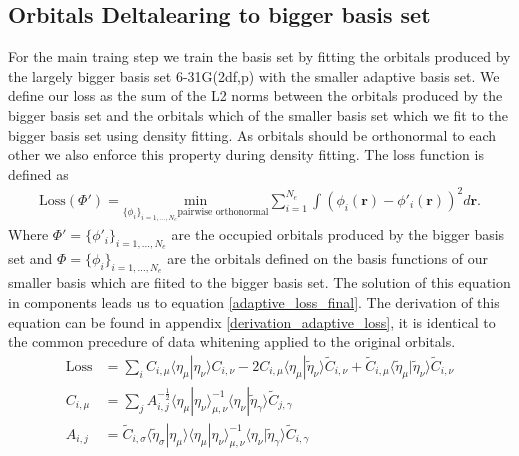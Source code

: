 \subsection{Orbitals Deltalearing to bigger basis set}
For the main traing step we train the basis set by fitting the orbitals produced by the largely bigger basis set 6-31G(2df,p) with the smaller adaptive basis set.
We define our loss as the sum of the L2 norms between the orbitals produced by the bigger basis set and the orbitals which of the smaller basis set which we fit to the bigger basis set using density fitting. As orbitals should be orthonormal to each other we also enforce this property during density fitting. The loss function is defined as
\begin{align}
    \text{Loss}(\Phi') = \underset{\{\phi_i\}_{i=1,...,N_e} \text{pairwise orthonormal}}{\text{min}}\sum\limits_{i=1}^{N_e} \int (\phi_i(\mathbf{r})-\phi'_i(\mathbf{r}))^2 d\mathbf{r}.
\end{align}
Where $\Phi' = \{\phi'_i\}_{i=1,...,N_e}$ are the occupied orbitals produced by the bigger basis set and $\Phi = \{\phi_i\}_{i=1,...,N_e}$ are the orbitals defined on the basis functions of our smaller basis  which are fiited to the bigger basis set. The solution of this equation in components leads us to equation \eqref{adaptive_loss_final}.
The derivation of this equation can be found in appendix \ref{derivation_adaptive_loss}, it is identical to the common precedure of data whitening applied to the original orbitals.
\begin{align}\label{adaptive_loss_final}
    \text{Loss} &= \sum_i C_{i,\mu} \langle\eta_\mu|\eta_\nu\rangle C_{i,\nu} - 2 C_{i,\mu} \langle\eta_\mu|\tilde\eta_\nu\rangle \tilde C_{i,\nu} + \tilde C_{i,\mu} \langle\tilde \eta_\mu|\tilde \eta_\nu\rangle \tilde C_{i,\nu}\\
     C_{i,\mu}&= \sum_{j} A^{-\frac{1}{2}}_{i,j} \langle\eta_\mu|\eta_\nu\rangle^{-1}_{\mu,\nu} \langle\eta_\nu|\tilde\eta_\gamma\rangle \tilde C_{j,\gamma}\\
    A_{i,j}&=\tilde C_{i,\sigma}\langle\tilde \eta_\sigma|\eta_\mu\rangle \langle\eta_\mu|\eta_\nu\rangle^{-1}_{\mu,\nu} \langle\eta_\nu|\tilde\eta_\gamma\rangle \tilde C_{i,\gamma}\\
\end{align}
